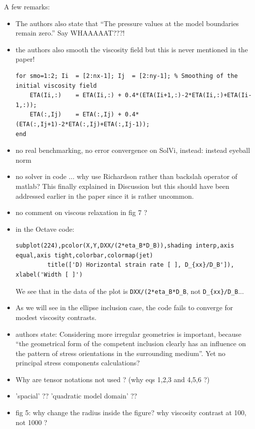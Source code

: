 A few remarks:
\begin{itemize}
\item The authors also state that ``The pressure values at the model boundaries remain zero.'' Say WHAAAAAT???!
\item the authors also smooth the viscosity field but this is never mentioned in the paper!
\begin{verbatim}
for smo=1:2; Ii  = [2:nx-1]; Ij  = [2:ny-1]; % Smoothing of the initial viscosity field
    ETA(Ii,:)    = ETA(Ii,:) + 0.4*(ETA(Ii+1,:)-2*ETA(Ii,:)+ETA(Ii-1,:));
    ETA(:,Ij)    = ETA(:,Ij) + 0.4*(ETA(:,Ij+1)-2*ETA(:,Ij)+ETA(:,Ij-1));
end
\end{verbatim}

\item no real benchmarking, no error convergence on SolVi, instead: instead eyeball norm
\item no solver in code ... why use Richardson rather than backslah operator of matlab? This finally explained in Discussion but
this should have been addressed earlier in the paper since it is rather uncommon.  
\item no comment on viscous relaxation in fig 7 ? 
\item in the Octave code:
\begin{verbatim}
subplot(224),pcolor(X,Y,DXX/(2*eta_B*D_B)),shading interp,axis equal,axis tight,colorbar,colormap(jet)
         title(['D) Horizontal strain rate [ ], D_{xx}/D_B']), xlabel('Width [ ]')
\end{verbatim}
We see that in the data of the plot is \verb|DXX/(2*eta_B*D_B|, not \verb|D_{xx}/D_B|...

\item As we will see in the ellipse inclusion case, the code fails to converge
for modest viscosity contrasts.

\item authors state: Considering more irregular geometries is important, 
because “the geometrical form of the competent
inclusion clearly has an influence on the pattern of stress orientations in the
surrounding medium”. Yet no principal stress components calculations? 

\item Why are tensor notations not used ? (why eqs 1,2,3 and 4,5,6 ?)

\item 'spacial' ?? 'quadratic model domain' ??

\item fig 5: why change the radius inside the figure? why viscosity contrast at 100, not 1000 ?


\end{itemize}
